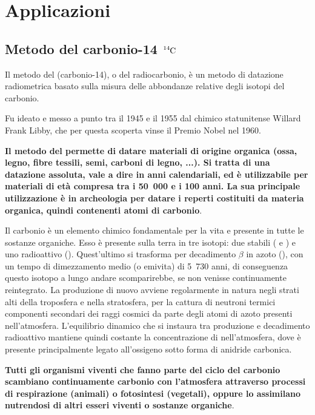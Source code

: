 \documentclass[a4paper,11pt,twoside,openany]{book}
\theoremstyle{definition}
\theoremstyle{plain}
\theoremstyle{plain}
\theoremstyle{definition}
\begin{document}
\chapter{Applicazioni} %

\section[Metodo del $\ce{^{14}C}$]{Metodo del carbonio-14 $\ce{^{14}C}$} %
Il metodo del  (carbonio-14), o del radiocarbonio, è un metodo di datazione radiometrica basato sulla misura delle abbondanze relative degli isotopi del carbonio.

Fu ideato e messo a punto tra il 1945 e il 1955 dal chimico statunitense Willard Frank Libby, che per questa scoperta vinse il Premio Nobel nel 1960.

\textbf{Il metodo del  permette di datare materiali di origine organica (ossa, legno, fibre tessili, semi, carboni di legno, ...). Si tratta di una datazione assoluta, vale a dire in anni calendariali, ed è utilizzabile per materiali di età compresa tra i \si{50.000} e i 100 anni. La sua principale utilizzazione è in archeologia per datare i reperti costituiti da materia organica, quindi contenenti atomi di carbonio}.

Il carbonio è un elemento chimico fondamentale per la vita e presente in tutte le sostanze organiche. Esso è presente sulla terra in tre isotopi: due stabili ( e ) e uno radioattivo (). Quest'ultimo si trasforma per decadimento $\beta$ in azoto (), con un tempo di dimezzamento medio (o emivita) di \si{5.730} anni, di conseguenza questo isotopo a lungo andare scomparirebbe, se non venisse continuamente reintegrato. La produzione di nuovo  avviene regolarmente in natura negli strati alti della troposfera e nella stratosfera, per la cattura di neutroni termici componenti secondari dei raggi cosmici da parte degli atomi di azoto presenti nell'atmosfera. L'equilibrio dinamico che si instaura tra produzione e decadimento radioattivo mantiene quindi costante la concentrazione di  nell'atmosfera, dove è presente principalmente legato all'ossigeno sotto forma di anidride carbonica.

\textbf{Tutti gli organismi viventi che fanno parte del ciclo del carbonio scambiano continuamente carbonio con l'atmosfera attraverso processi di respirazione (animali) o fotosintesi (vegetali), oppure lo assimilano nutrendosi di altri esseri viventi o sostanze organiche}.
\end{document}
